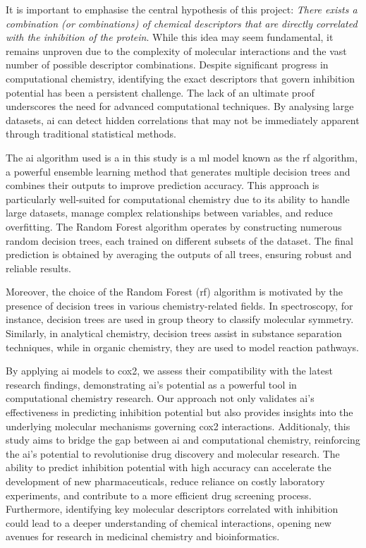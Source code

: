 \documentclass[11pt]{article}
\begin{document}
It is important to emphasise the central hypothesis of this project: \emph{There exists a combination (or combinations) of chemical descriptors that are directly correlated with the inhibition of the protein}. While this idea may seem fundamental, it remains unproven due to the complexity of molecular interactions and the vast number of possible descriptor combinations. Despite significant progress in computational chemistry, identifying the exact descriptors that govern inhibition potential has been a persistent challenge. The lack of an ultimate proof underscores the need for advanced computational techniques. By analysing large datasets, \gls{ai} can detect hidden correlations that may not be immediately apparent through traditional statistical methods.

The \gls{ai} algorithm used is a in this study is a \gls{ml} model known as the \gls{rf} algorithm\cite{MachineLearningRandomForest}\cite{UAB_ComputationalChemistry}, a powerful ensemble learning method that generates multiple decision trees and combines their outputs to improve prediction accuracy. This approach is particularly well-suited for computational chemistry due to its ability to handle large datasets, manage complex relationships between variables, and reduce overfitting. The Random Forest algorithm operates by constructing numerous random decision trees, each trained on different subsets of the dataset. The final prediction is obtained by averaging the outputs of all trees, ensuring robust and reliable results.

Moreover, the choice of the Random Forest (\gls{rf}) algorithm is motivated by the presence of decision trees in various chemistry-related fields. In spectroscopy, for instance, decision trees are used in group theory to classify molecular symmetry. Similarly, in analytical chemistry, decision trees assist in substance separation techniques, while in organic chemistry, they are used to model reaction pathways.

By applying \gls{ai} models to \gls{cox2}, we assess their compatibility with the latest research findings\cite{Cox2InhibitorsReview}, demonstrating \gls{ai}’s potential as a powerful tool in computational chemistry research. Our approach not only validates \gls{ai}’s effectiveness in predicting inhibition potential but also provides insights into the underlying molecular mechanisms governing \gls{cox2} interactions. Additionaly, this study aims to bridge the gap between \gls{ai} and computational chemistry, reinforcing the \gls{ai}’s potential to revolutionise drug discovery and molecular research. The ability to predict inhibition potential with high accuracy can accelerate the development of new pharmaceuticals, reduce reliance on costly laboratory experiments, and contribute to a more efficient drug screening process. Furthermore, identifying key molecular descriptors correlated with inhibition could lead to a deeper understanding of chemical interactions, opening new avenues for research in medicinal chemistry and bioinformatics.
\end{document}
